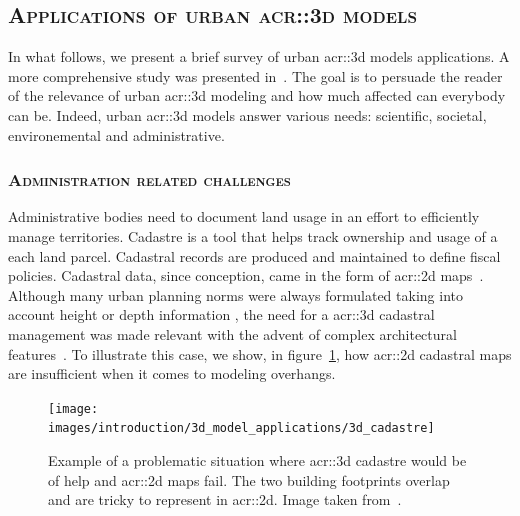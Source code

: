    \subsection{\textsc{Applications of urban \texorpdfstring{\gls*{acr::3d}}{3D} models}}
        \label{subsec::introduction::urban_3d_reconstruction::applications}
        In what follows, we present a brief survey of  urban \gls{acr::3d} models applications.
        A more comprehensive study was presented in~\textcite{ijgi4042842}.
        The goal is to persuade the reader of the relevance of urban \gls{acr::3d} modeling and how much affected can everybody can be.
        Indeed, urban \gls{acr::3d} models answer various needs: scientific, societal, environemental and administrative.

        \subsubsection{\textsc{Administration related challenges}}
            Administrative bodies need to document land usage in an effort to efficiently manage territories.
            Cadastre is a tool that helps track ownership and usage of a each land parcel.
            Cadastral records are produced and maintained to define fiscal policies.
            Cadastral data, since conception, came in the form of \gls{acr::2d} maps~\parencite{billen20033d}.
            Although many urban planning norms were always formulated taking into account height or depth information \parencite{brasebin20183d}, the need for a \gls{acr::3d} cadastral management was made relevant with the advent of complex architectural features~\parencite{ijgi4042842}.
            To illustrate this case, we show, in figure~\ref{fig::3d_cadastre_need_example}, how \gls{acr::2d} cadastral maps are insufficient when it comes to modeling overhangs.\\
            \begin{figure}[!htpb]
                \centering
                \texttt{[image: images/introduction/3d\_model\_applications/3d\_cadastre]}
                \caption[
                    Example of a problematic situation where \acrshort*{acr::3d} cadastre would be of help and \acrshort*{acr::2d} maps fail.
                ]{
                    \label{fig::3d_cadastre_need_example}
                    Example of a problematic situation where \acrshort*{acr::3d} cadastre would be of help and \acrshort*{acr::2d} maps fail.
                    The two building footprints overlap and are tricky to represent in \acrshort*{acr::2d}.
                    Image taken from~\parencite{ijgi4042842}.
                }
            \end{figure}

